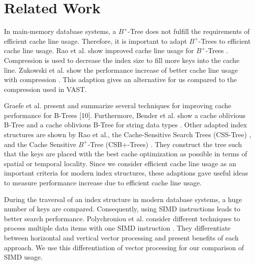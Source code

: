 \documentclass[conference]{IEEEtran}
\begin{document}

\section{Related Work}
In main-memory database systems, a $B^+$-Tree does not fulfill the requirements of efficient cache line usage. Therefore, it is important to adapt $B^+$-Trees to efficient cache line usage. Rao et al. show improved cache line usage for $B^+$-Trees \cite{b8}.  Compression is used to decrease the index size to fill more keys into the cache line. Zukowski et al. show the performance increase of better cache line usage with compression \cite{b9}. This adaption gives an alternative for us compared to the compression used in VAST.

Graefe et al. present and summarize several techniques for improving cache performance for B-Trees [10]. Furthermore,
Bender et al. show a cache oblivious B-Tree \cite{b11} and a cache oblivious B-Tree for string data types \cite{b12}. Other adapted index structures are shown by Rao et al., the Cache-Sensitive Search Trees (CSS-Tree) \cite{b8}, and the Cache Sensitive $B^+$-Tree (CSB+-Trees) \cite{b13}. They construct the tree such that the keys are placed with the best cache optimization as possible in terms of spatial or temporal locality. Since we consider efficient cache line usage as an important criteria for modern index structures, these adaptions gave useful ideas to measure performance increase due to efficient cache line usage. 

During the traversal of an index structure in modern database systems, a huge number of keys are compared. Consequently, using SIMD instructions leads to better search performance. Polychroniou et al. consider different techniques to process multiple data items with one SIMD instruction \cite{b7}. They differentiate between horizontal and vertical vector processing and present benefits of each approach. We use this differentiation of vector processing for our comparison of SIMD usage.  
\end{document}
